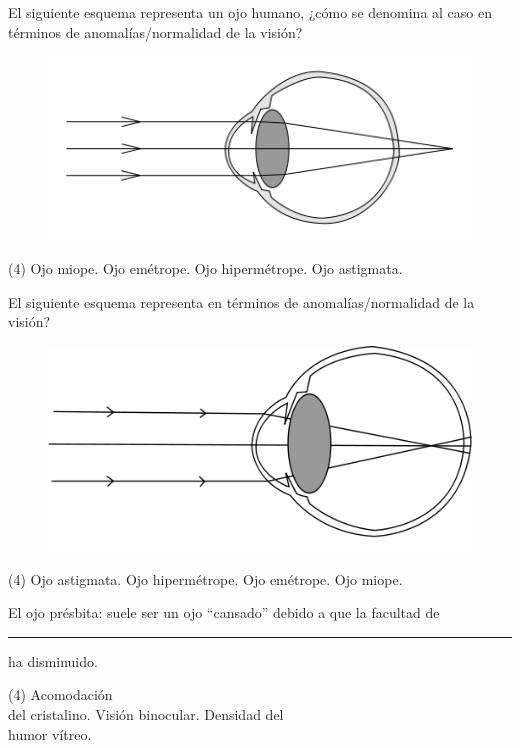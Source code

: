 \documentclass[12pt, letter]{exam}
\begin{document}
\begin{questions}
    \question El siguiente esquema representa un ojo humano, ¿cómo se denomina al caso en términos de anomalías/normalidad de la visión?
    \begin{figure}[H]
        \centering
        \includegraphics[scale=0.4]{Imagenes/Defectos_Vision_05.png}
    \end{figure}
    \begin{tasks}(4)
        \task Ojo miope.
        \task Ojo emétrope.
        \task Ojo hipermétrope.
        \task Ojo astigmata.
    \end{tasks}
    \question El siguiente esquema representa en términos de anomalías/normalidad de la visión?
    \begin{figure}[H]
        \centering
        \includegraphics[scale=0.3]{Imagenes/Defectos_Vision_03.png}
    \end{figure}
    \begin{tasks}(4)
        \task Ojo astigmata.
        \task Ojo hipermétrope.
        \task Ojo emétrope.
        \task Ojo miope.
    \end{tasks}
    \question El ojo présbita: suele ser un ojo \enquote{cansado} debido a que la facultad de \rule{2cm}{0.1mm} ha disminuido.
    \begin{tasks}(4)
        \task Acomodación \\ del cristalino.
        \task Visión binocular.
        \task Densidad del \\ humor vítreo.

\end{tasks}
\end{questions}
\end{document}
